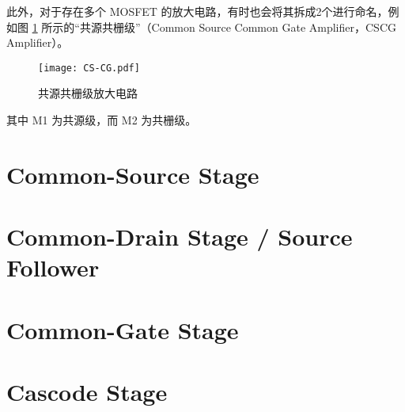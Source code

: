 此外，对于存在多个 MOSFET 的放大电路，有时也会将其拆成2个进行命名，例如图 \ref{fig:CS-CG} 所示的“共源共栅级”（Common Source Common Gate Amplifier，CSCG Amplifier）。
\begin{figure}[htp!]
    \centering
    \texttt{[image: CS-CG.pdf]}
    \caption{共源共栅级放大电路}
    \label{fig:CS-CG}
\end{figure}
其中 M1 为共源级，而 M2 为共栅级。

\section{Common-Source Stage}

\section{Common-Drain Stage / Source Follower}

\section{Common-Gate Stage}

\section{Cascode Stage}
